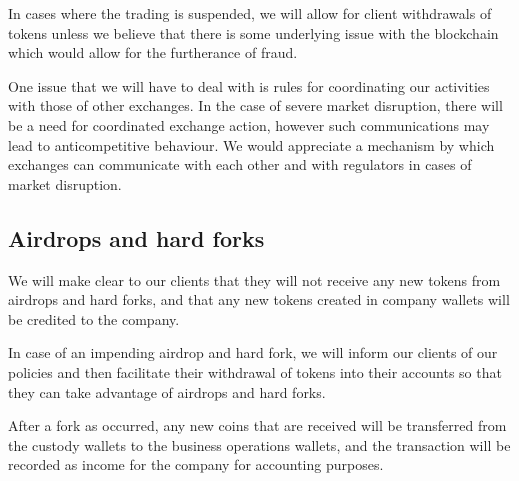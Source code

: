 In cases where the trading is suspended, we will allow for client
withdrawals of tokens unless we believe that there is some underlying
issue with the blockchain which would allow for the furtherance of
fraud.

One issue that we will have to deal with is rules for coordinating our
activities with those of other exchanges.  In the case of severe market
disruption, there will be a need for coordinated exchange action,
however such communications may lead to anticompetitive behaviour.  We
would appreciate a mechanism by which exchanges can communicate with
each other and with regulators in cases of market disruption.

\subsection{Airdrops and hard forks}
We will make clear to our clients that they will not receive any
new tokens from airdrops and hard forks, and that any new tokens
created in company wallets will be credited to the company.

In case of an impending airdrop and hard fork, we will inform our
clients of our policies and then facilitate their withdrawal of tokens
into their accounts so that they can take advantage of airdrops and
hard forks.

After a fork as occurred, any new coins that are received will be transferred from the custody wallets to the business operations wallets, and the transaction will be recorded as income for the company for accounting purposes.



